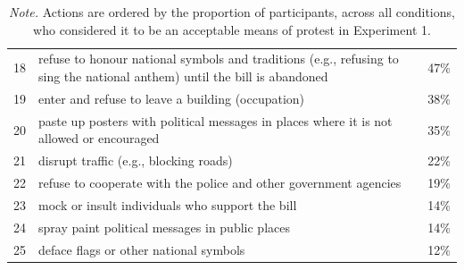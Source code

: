 \documentclass[12pt, letterpaper]{article}
\begin{document}
\begin{table}
\begin{tabularx}{\linewidth}{rXr}
18 & refuse to honour national symbols and traditions (e.g., refusing to sing the national anthem) until the bill is abandoned & 47\%\\
19 & enter and refuse to leave a building (occupation) & 38\%\\
20 & paste up posters with political messages in places where it is not allowed or encouraged & 35\%\\
21 & disrupt traffic (e.g., blocking roads) & 22\%\\
22 & refuse to cooperate with the police and other government agencies & 19\%\\
23 & mock or insult individuals who support the bill & 14\%\\
24 & spray paint political messages in public places & 14\%\\
25 & deface flags or other national symbols & 12\%\\
\bottomrule
\end{tabularx}
\caption*{\textit{Note.} Actions are ordered by the proportion of participants, across all conditions, who considered it to be an acceptable means of protest in Experiment 1.}

\end{table}

\setcounter{table}{0}
\renewcommand{\thetable}{B\arabic{table}}
\end{document}
